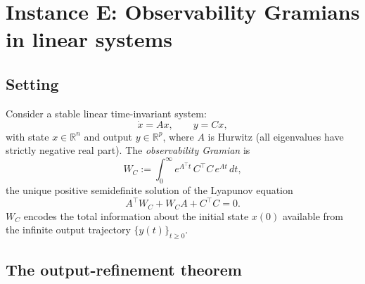 \documentclass[11pt,a4paper]{article}
\numberwithin{equation}{section}
\newcommand{\R}{\mathbb{R}}
\theoremstyle{thmcompact}
\theoremstyle{remark}
\begin{document}
\section{Instance E: Observability Gramians in linear systems}
\label{sec:bridge-E}

\subsection{Setting}

Consider a stable linear time-invariant system:
\begin{equation}\label{eq:E-system}
\dot{x} = Ax, \qquad y = Cx,
\end{equation}
with state $x \in \R^n$ and output $y \in \R^p$, where $A$ is Hurwitz (all eigenvalues have strictly negative real part). The \emph{observability Gramian} is
\begin{equation}\label{eq:E-gramian}
W_C := \int_0^\infty e^{A^\top t}\,C^\top C\,e^{At}\,dt,
\end{equation}
the unique positive semidefinite solution of the Lyapunov equation
\begin{equation}\label{eq:E-lyapunov}
A^\top W_C + W_C A + C^\top C = 0.
\end{equation}
$W_C$ encodes the total information about the initial state $x(0)$ available from the infinite output trajectory $\{y(t)\}_{t \geq 0}$.

\subsection{The output-refinement theorem}
\end{document}
